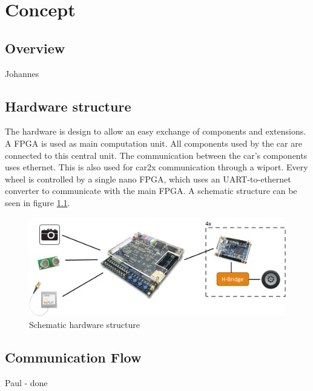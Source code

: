 \chapter{Concept}

\section{Overview}
Johannes

\section{Hardware structure}
The hardware is design to allow an easy exchange of components and extensions. A FPGA is used as main computation unit. All components used by the car are connected to this central unit. The communication between the car's components uses ethernet. This is also used for car2x communication through a wiport. Every wheel is controlled by a single nano FPGA, which uses an UART-to-ethernet converter to communicate with the main FPGA. A schematic structure can be seen in figure \ref{HWconc}.
\begin{center}
\begin{figure}[h]
	\includegraphics[width=\textwidth]{figures/hardwareconcept.png}
	\caption{Schematic hardware structure} \label{HWconc}
\end{figure}
\end{center}

\section{Communication Flow}
Paul - done

